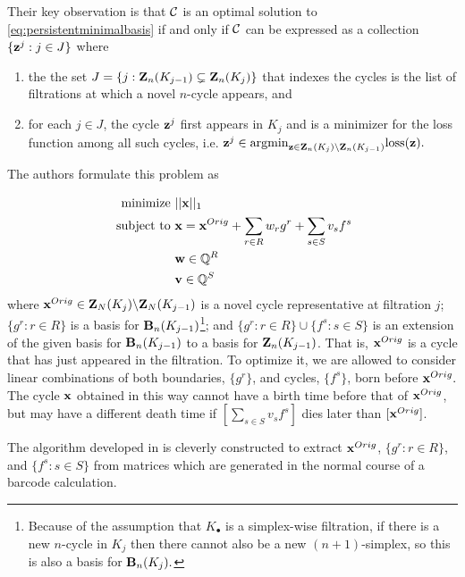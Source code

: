  
Their key observation is that $\mathcal{C}$ is an optimal solution to \pr \eqref{eq:persistentminimalbasis} if and only if $\mathcal{C}$ can be expressed as a collection $\{{\mathbf z}^j : j \in J\}$ where  \begin{enumerate}
    \item the the set $J = \{j :  \mathbf{Z}_n(K_{j-1}) \subsetneq \mathbf{Z}_n(K_j) \}$ that indexes the cycles is the list of filtrations at which a novel $n$-cycle appears, and
    \item for each $j \in J$, the cycle ${\mathbf z}^j$ first appears in $K_j$ and is a minimizer for the loss function among all such cycles, i.e. ${\mathbf z}^j \in \mathrm{argmin}_{{\mathbf z} \in \mathbf{Z}_n(K_j) \backslash \mathbf{Z}_n(K_{j-1})} \mathrm{loss}({\mathbf z}).$
\end{enumerate}
The authors formulate this problem as 

 
\begin{align}
\begin{split}
\text{minimize } & ||\mathbf{x} ||_1  \\
\text{ subject to } & \mathbf{x} = \mathbf{x}^{Orig} + \sum_{r\in R} w_r g^r + \sum_{s \in S} v_s f^s \\
& \mathbf{w} \in \mathbb{Q}^R  \\
& \mathbf{v} \in \mathbb{Q}^S
\end{split}
\label{eq:escolarargmin}
\end{align}
where $\mathbf{x}^{Orig} \in\mathbf{Z}_N(K_j) \backslash \mathbf{Z}_N(K_{j-1})$ is a novel cycle representative at filtration $j$; $\{g^r : r \in R\}$ is a basis for $\mathbf{B}_n(K_{j-1})$\footnote{Because of the assumption that $K_\bullet$ is a simplex-wise filtration, if there is a new $n$-cycle in $K_j$ then there cannot also be a new $(n+1)$-simplex, so this is also a basis for $\mathbf{B}_n(K_j).$}; and $\{g^r : r \in R\} \cup \{f^s : s \in S\}$ is an extension of the given basis for $\mathbf{B}_n(K_{j-1})$ to a basis for $\mathbf{Z}_n(K_{j-1})$. That is, $\mathbf{x}^{Orig}$ is a cycle that has just appeared in the filtration. To optimize it, we are allowed to consider linear combinations of both boundaries, $\{g^r\}$, and cycles, $\{f^s\}$, born before $\mathbf{x}^{Orig}.$ The cycle $\mathbf{x}$ obtained in this way cannot have a birth time before that of $\mathbf{x}^{Orig}$, but may have a different death time if $[\sum_{s\in S}v_sf^s]$ dies later than $[\mathbf{x}^{Orig}]$. 

 

The algorithm developed in \cite{Escolar2016} is cleverly constructed to extract $\mathbf{x}^{Orig}$, $\{g^r : r \in R\}$, and $\{f^s : s \in S\}$ from matrices which are generated in the normal course of a barcode calculation.


